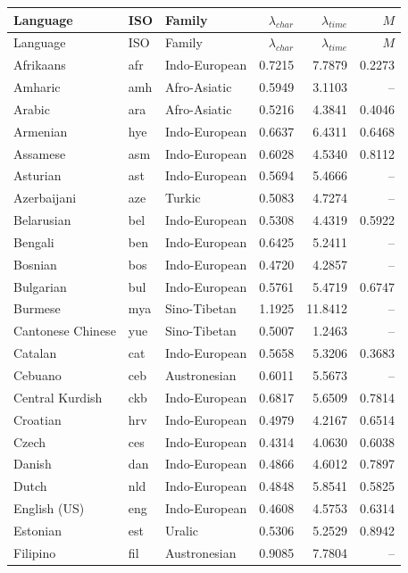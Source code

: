 \begin{longtable}{p{3.1cm}p{0.9cm}p{2.7cm}rrr}\toprule Language & ISO & Family & $\lambda_{char}$ & $\lambda_{time}$ & $M$\\ \midrule\endfirsthead\toprule Language & ISO & Family & $\lambda_{char}$ & $\lambda_{time}$ & $M$\\ \midrule\endhead
Afrikaans & afr & Indo-European & 0.7215 & 7.7879 & 0.2273\\
Amharic & amh & Afro-Asiatic & 0.5949 & 3.1103 & --\\
Arabic & ara & Afro-Asiatic & 0.5216 & 4.3841 & 0.4046\\
Armenian & hye & Indo-European & 0.6637 & 6.4311 & 0.6468\\
Assamese & asm & Indo-European & 0.6028 & 4.5340 & 0.8112\\
Asturian & ast & Indo-European & 0.5694 & 5.4666 & --\\
Azerbaijani & aze & Turkic & 0.5083 & 4.7274 & --\\
Belarusian & bel & Indo-European & 0.5308 & 4.4319 & 0.5922\\
Bengali & ben & Indo-European & 0.6425 & 5.2411 & --\\
Bosnian & bos & Indo-European & 0.4720 & 4.2857 & --\\
Bulgarian & bul & Indo-European & 0.5761 & 5.4719 & 0.6747\\
Burmese & mya & Sino-Tibetan & 1.1925 & 11.8412 & --\\
Cantonese Chinese & yue & Sino-Tibetan & 0.5007 & 1.2463 & --\\
Catalan & cat & Indo-European & 0.5658 & 5.3206 & 0.3683\\
Cebuano & ceb & Austronesian & 0.6011 & 5.5673 & --\\
Central Kurdish & ckb & Indo-European & 0.6817 & 5.6509 & 0.7814\\
Croatian & hrv & Indo-European & 0.4979 & 4.2167 & 0.6514\\
Czech & ces & Indo-European & 0.4314 & 4.0630 & 0.6038\\
Danish & dan & Indo-European & 0.4866 & 4.6012 & 0.7897\\
Dutch & nld & Indo-European & 0.4848 & 5.8541 & 0.5825\\
English (US) & eng & Indo-European & 0.4608 & 4.5753 & 0.6314\\
Estonian & est & Uralic & 0.5306 & 5.2529 & 0.8942\\
Filipino & fil & Austronesian & 0.9085 & 7.7804 & --\\

\end{longtable}
